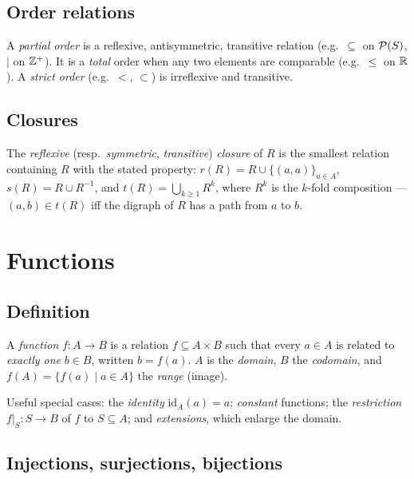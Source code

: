 \subsection{Order relations}

\begin{definition}
A \emph{partial order} is a reflexive, antisymmetric, transitive relation
(e.g.\ $\subseteq$ on $\mathcal{P}(S)$, $\mid$ on $\mathbb{Z}^+$). It is a \emph{total}
order when any two elements are comparable (e.g.\ $\leq$ on $\mathbb{R}$). A
\emph{strict order} (e.g.\ $<$, $\subset$) is irreflexive and transitive.
\end{definition}

\subsection{Closures}

\begin{definition}
The \emph{reflexive} (resp.\ \emph{symmetric}, \emph{transitive})
\emph{closure} of $R$ is the smallest relation containing $R$ with the stated
property: $r(R) = R \cup \{(a,a)\}_{a \in A}$, $s(R) = R \cup R^{-1}$, and
$t(R) = \bigcup_{k \geq 1} R^k$, where $R^k$ is the $k$-fold composition ---
$(a,b) \in t(R)$ iff the digraph of $R$ has a path from $a$ to $b$.
\end{definition}

\section{Functions}

\subsection{Definition}

\begin{definition}
A \emph{function} $f : A \to B$ is a relation $f \subseteq A \times B$ such
that every $a \in A$ is related to \emph{exactly one} $b \in B$, written
$b = f(a)$. $A$ is the \emph{domain}, $B$ the \emph{codomain}, and
$f(A) = \{f(a) \mid a \in A\}$ the \emph{range} (image).
\end{definition}

Useful special cases: the \emph{identity} $\mathrm{id}_A(a) = a$;
\emph{constant} functions; the \emph{restriction} $f|_S : S \to B$ of $f$ to
$S \subseteq A$; and \emph{extensions}, which enlarge the domain.

\subsection{Injections, surjections, bijections}

